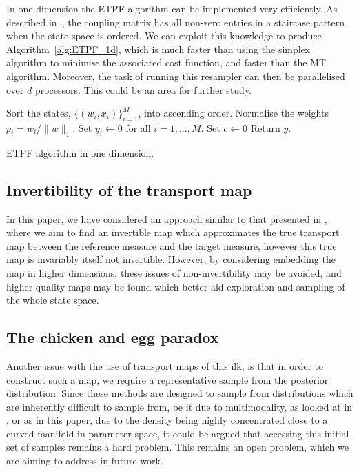 \documentclass[final]{siamltex}
\begin{document}
In one
dimension the ETPF algorithm can be implemented very efficiently. As
described in~\cite{reich2013nonparametric}, the coupling matrix has
all non-zero entries in a staircase pattern when the state space is
ordered. We can exploit this knowledge to produce
Algorithm~\ref{alg:ETPF_1d}, which is much faster than using the
simplex algorithm to minimise the associated cost function, and faster
than the MT algorithm\cite{cotter2015parallel}. Moreover, the task of
running this resampler can then be parallelised over $d$
processors. This could be an area for further study.

\begin{table}[!htpb]
\begin{algorithm}[H]
\DontPrintSemicolon
\BlankLine
Sort the states, $\{(w_i, x_i)\}_{i=1}^M$, into ascending order.\;
Normalise the weights $p_i = w_i/\|w\|_1$.\;
Set $y_i \leftarrow 0$ for all $i=1,\dots,M$.\;
Set $c \leftarrow 0$\;
Return $y$.\;
\caption{ETPF algorithm in one dimension.\label{alg:ETPF_1d}}
\end{algorithm}
\end{table}

\subsection{Invertibility of the transport map}
In this paper, we have considered an approach similar to that
presented in \cite{parno2014transport}, where we aim to find an
invertible map which approximates the true transport map between the
reference measure and the target measure, however this true map is
invariably itself not invertible. However, by considering embedding
the map in higher dimensions\cite{whitney_self-intersections_1994,nash1956imbedding,takens_detecting_1981}, these issues of non-invertibility may be
avoided, and higher quality maps may be found which better aid
exploration and sampling of the whole state space.

\subsection{The chicken and egg paradox}
Another issue with the use of transport maps of this ilk, is that in
order to construct such a map, we require a representative sample from
the posterior distribution. Since these methods are designed to sample
from distributions which are inherently difficult to sample from, be
it due to multimodality, as looked at in \cite{cotter2015parallel}, or
as in this paper, due to the density being highly concentrated close
to a curved manifold in parameter space, it could be argued that accessing this initial set of
samples remains a hard problem. This remains an open problem, which we
are aiming to address in future work.




\end{document}
